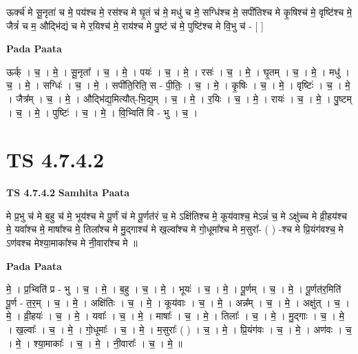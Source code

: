 \documentclass[17pt]{extarticle}
\begin{document}
ऊर्क्च॑ मे सू॒नृता॑ च मे॒ पय॑श्च मे॒ रस॑श्च मे घृ॒तं च॑ मे॒ मधु॑ च मे॒ सग्धि॑श्च मे॒ सपी॑तिश्च मे कृ॒षिश्च॑ मे॒ वृष्टि॑श्च मे॒ जैत्रं॑ च म॒ औद्भि॑द्यं च मे र॒यिश्च॑ मे॒ राय॑श्च मे पु॒ष्टं च॑ मे॒ पुष्टि॑श्च मे वि॒भु च॑ - [  ] \newline

\textbf{Pada Paata} \newline

ऊर्क् । च॒ । मे॒ । सू॒नृता᳚ । च॒ । मे॒ । पयः॑ । च॒ । मे॒ । रसः॑ । च॒ । मे॒ । घृ॒तम् । च॒ । मे॒ । मधु॑ । च॒ । मे॒ । सग्धिः॑ । च॒ । मे॒ । सपी॑ति॒रिति॒ स - पी॒तिः॒ । च॒ । मे॒ । कृ॒षिः । च॒ । मे॒ । वृष्टिः॑ । च॒ । मे॒ । जैत्र᳚म् । च॒ । मे॒ । औद्भि॑द्य॒मित्यौत्-भि॒द्य॒म् । च॒ । मे॒ । र॒यिः । च॒ । मे॒ । रायः॑ । च॒ । मे॒ । पु॒ष्टम् । च॒ । मे॒ । पुष्टिः॑ । च॒ । मे॒ । वि॒भ्विति॑ वि - भु । च॒ ।  \newline





\section{ TS 4.7.4.2 }

\textbf{TS 4.7.4.2 } \newline
\textbf{Samhita Paata} \newline

मे प्र॒भु च॑ मे ब॒हु च॑ मे॒ भूय॑श्च मे पू॒र्णं च॑ मे पू॒र्णत॑रं च॒ मे   ऽक्षि॑तिश्च मे॒ कूय॑वाश्च॒ मेऽन्नं॑ च॒ मे ऽक्षु॑च्च मे व्री॒हय॑श्च मे॒       यवा᳚श्च मे॒ माषा᳚श्च मे॒ तिला᳚श्च मे मु॒द्गाश्च॑ मे ख॒ल्वा᳚श्च मे गो॒धूमा᳚श्च मे म॒सुरा᳚- ( ) -श्च मे प्रि॒यंग॑वश्च॒ मे ऽण॑वश्च मेश्या॒माका᳚श्च मे नी॒वारा᳚श्च मे ॥ \newline

\textbf{Pada Paata} \newline

मे॒ । प्र॒भ्विति॑ प्र - भु । च॒ । मे॒ । ब॒हु । च॒ । मे॒ । भूयः॑ । च॒ । मे॒ । पू॒र्णम् । च॒ । मे॒ । पू॒र्णत॑र॒मिति॑ पू॒र्ण - त॒र॒म् । च॒ । मे॒ । अक्षि॑तिः । च॒ । मे॒ । कूय॑वाः । च॒ । मे॒ । अन्न᳚म् । च॒ । मे॒ । अक्षु॑त् । च॒ । मे॒ । व्री॒हयः॑ । च॒ । मे॒ । यवाः᳚ । च॒ । मे॒ । माषाः᳚ । च॒ । मे॒ । तिलाः᳚ । च॒ । मे॒ । मु॒द्गाः । च॒ । मे॒ । ख॒ल्वाः᳚ । च॒ । मे॒ । गो॒धूमाः᳚ । च॒ । मे॒ । म॒सुराः᳚ ( ) । च॒ । मे॒ । प्रि॒यंग॑वः । च॒ । मे॒ । अण॑वः । च॒ । मे॒ । श्या॒माकाः᳚ । च॒ । मे॒ । नी॒वाराः᳚ । च॒ । मे॒ ॥  \newline
\end{document}
